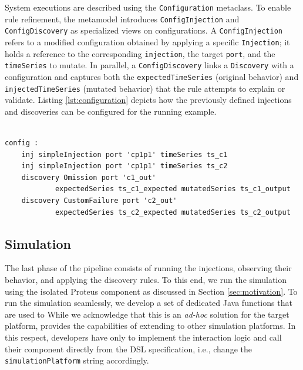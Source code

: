 System executions are described using the \texttt{Configuration} metaclass. To enable rule refinement, the metamodel  introduces \texttt{ConfigInjection} and \texttt{Config\-Discovery} as specialized views on configurations. A \texttt{ConfigInjection} refers to a modified configuration obtained by applying a specific \texttt{Injection}; it holds a reference to the corresponding \texttt{injection}, the target \texttt{port}, and the \texttt{timeSeries} to mutate. In parallel, a \texttt{ConfigDiscovery} links a \texttt{Discovery} with a configuration and captures both the \texttt{expectedTimeSeries} (original behavior) and \texttt{injectedTimeSeries} (mutated behavior) that the rule attempts to explain or validate. Listing \ref{lst:configuration} depicts how the previously defined injections and discoveries can be configured for the running example. 

\begin{lstlisting}[style=JavaStyle,caption=Configuration of injections and discoveries.,label=lst:configuration]

config :
	inj simpleInjection port 'cp1p1' timeSeries ts_c1
	inj simpleInjection port 'cp1p1' timeSeries ts_c2
	discovery Omission port 'c1_out' 
            expectedSeries ts_c1_expected mutatedSeries ts_c1_output
	discovery CustomFailure port 'c2_out' 
            expectedSeries ts_c2_expected mutatedSeries ts_c2_output
\end{lstlisting}




\subsection{Simulation} 


The last phase of the pipeline consists of running the injections, observing their behavior, and applying the discovery rules. To this end, we run the simulation using the isolated Proteus component as discussed in Section \ref{sec:motivation}. To run the simulation seamlessly, we develop a set of dedicated Java functions that are used to 
While we acknowledge that this is an \textit{ad-hoc} solution for the target platform, \tool provides the capabilities of extending to other simulation platforms. In this respect, developers have only to implement the interaction logic and call their component directly from the DSL specification, i.e., change the \texttt{simulationPlatform} string accordingly. 



